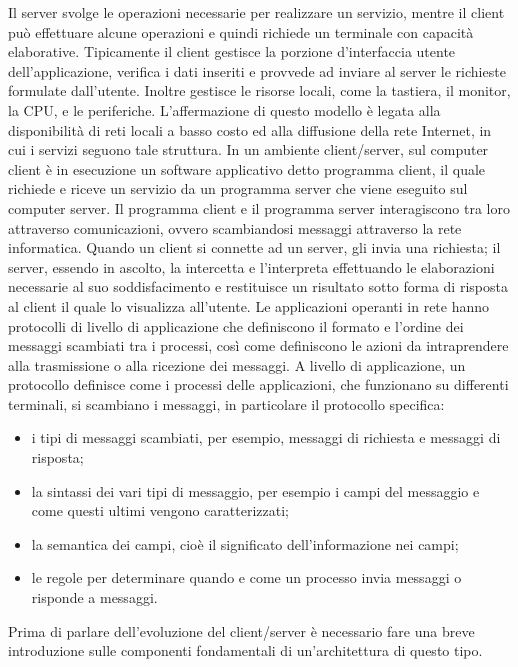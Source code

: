 Il server svolge le operazioni necessarie per realizzare un servizio, mentre il client può effettuare alcune operazioni e quindi richiede un terminale con capacità elaborative. Tipicamente il client gestisce la porzione d'interfaccia utente dell'applicazione, verifica i dati inseriti e provvede ad inviare al server le richieste formulate dall'utente. Inoltre gestisce le risorse locali, come la tastiera, il monitor, la CPU, e le periferiche.
L'affermazione di questo modello è legata alla disponibilità di reti locali a basso costo ed alla diffusione della rete Internet, in cui i servizi seguono tale struttura.
In un ambiente client/server, sul computer client è in esecuzione un software applicativo detto programma client, il quale richiede e riceve un servizio da un programma server che viene eseguito sul computer server. 
Il programma client e il programma server interagiscono tra loro attraverso comunicazioni, ovvero scambiandosi messaggi attraverso la rete informatica. Quando un client si connette ad un server, gli invia una richiesta; il server, essendo in ascolto, la intercetta e l'interpreta effettuando le elaborazioni necessarie al suo soddisfacimento e restituisce un risultato sotto forma di risposta al client il quale lo visualizza all'utente.
Le applicazioni operanti in rete hanno protocolli di livello di applicazione che definiscono il formato e l'ordine dei messaggi scambiati tra i processi, così come definiscono le azioni da intraprendere alla trasmissione o alla ricezione dei messaggi.
A livello di applicazione, un protocollo definisce come i processi delle applicazioni, che funzionano su differenti terminali, si scambiano i messaggi, in particolare il protocollo specifica:
\begin{itemize}
\item i tipi di messaggi scambiati, per esempio, messaggi di richiesta e messaggi di risposta;
\item la sintassi dei vari tipi di messaggio, per esempio i campi del messaggio e come questi ultimi
vengono caratterizzati;
\item la semantica dei campi, cioè il significato dell'informazione nei campi;
\item le regole per determinare quando e come un processo invia messaggi o risponde a messaggi.
\end{itemize}


Prima di parlare dell'evoluzione del client/server è necessario fare una breve introduzione sulle componenti fondamentali di un'architettura di questo tipo.



